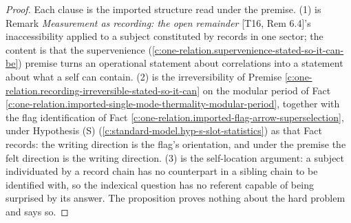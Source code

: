 \documentclass[11pt]{article}
\theoremstyle{definition}
\theoremstyle{plain}
\begin{document}
\begin{proof}
Each clause is the imported structure read under the premise. (1) is Remark \emph{Measurement as recording: the open remainder} [T16, Rem 6.4]'s inaccessibility applied to a subject constituted by records in one sector; the content is that the supervenience (\ref{c:one-relation.supervenience-stated-so-it-can-be}) premise turns an operational statement about correlations into a statement about what a self can contain. (2) is the irreversibility of Premise \ref{c:one-relation.recording-irreversible-stated-so-it-can} on the modular period of Fact \ref{c:one-relation.imported-single-mode-thermality-modular-period}, together with the flag identification of Fact \ref{c:one-relation.imported-flag-arrow-superselection}, under Hypothesis (S) (\ref{c:standard-model.hyp-s-slot-statistics}) as that Fact records: the writing direction is the flag's orientation, and under the premise the felt direction is the writing direction. (3) is the self-location argument: a subject individuated by a record chain has no counterpart in a sibling chain to be identified with, so the indexical question has no referent capable of being surprised by its answer. The proposition proves nothing about the hard problem and says so.

\end{proof}
\end{document}
